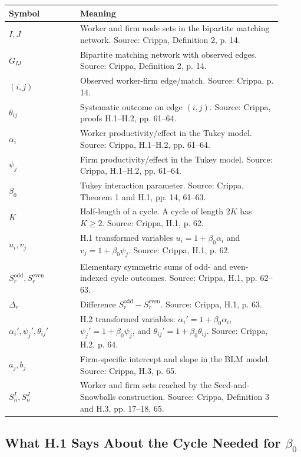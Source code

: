 \documentclass[11pt]{article}
\begin{document}
\begin{center}
\begin{tabular}{>{\raggedright\arraybackslash}p{0.24\linewidth}
                >{\raggedright\arraybackslash}p{0.68\linewidth}}
\toprule
Symbol & Meaning \\
\midrule
$I,J$ & Worker and firm node sets in the bipartite matching network. Source: Crippa, Definition 2, p. 14. \\
$G_{IJ}$ & Bipartite matching network with observed edges. Source: Crippa, Definition 2, p. 14. \\
$(i,j)$ & Observed worker-firm edge/match. Source: Crippa, p. 14. \\
$\theta_{ij}$ & Systematic outcome on edge $(i,j)$. Source: Crippa, proofs H.1--H.2, pp. 61--64. \\
$\alpha_i$ & Worker productivity/effect in the Tukey model. Source: Crippa, H.1--H.2, pp. 61--64. \\
$\psi_j$ & Firm productivity/effect in the Tukey model. Source: Crippa, H.1--H.2, pp. 61--64. \\
$\beta_0$ & Tukey interaction parameter. Source: Crippa, Theorem 1 and H.1, pp. 14, 61--63. \\
$K$ & Half-length of a cycle. A cycle of length $2K$ has $K\geq2$. Source: Crippa, H.1, p. 62. \\
$u_i,v_j$ & H.1 transformed variables $u_i=1+\beta_0\alpha_i$ and $v_j=1+\beta_0\psi_j$. Source: Crippa, H.1, p. 62. \\
$S_r^{\mathrm{odd}},S_r^{\mathrm{even}}$ & Elementary symmetric sums of odd- and even-indexed cycle outcomes. Source: Crippa, H.1, pp. 62--63. \\
$\Delta_r$ & Difference $S_r^{\mathrm{odd}}-S_r^{\mathrm{even}}$. Source: Crippa, H.1, p. 63. \\
$\alpha_i',\psi_j',\theta_{ij}'$ & H.2 transformed variables: $\alpha_i'=1+\beta_0\alpha_i$, $\psi_j'=1+\beta_0\psi_j$, and $\theta_{ij}'=1+\beta_0\theta_{ij}$. Source: Crippa, H.2, p. 64. \\
$a_j,b_j$ & Firm-specific intercept and slope in the BLM model. Source: Crippa, H.3, p. 65. \\
$S_n^I,S_n^J$ & Worker and firm sets reached by the Seed-and-Snowballs construction. Source: Crippa, Definition 3 and H.3, pp. 17--18, 65. \\
\bottomrule
\end{tabular}
\end{center}

\subsection{What H.1 Says About the Cycle Needed for \texorpdfstring{$\beta_0$}{beta0}}
\end{document}
